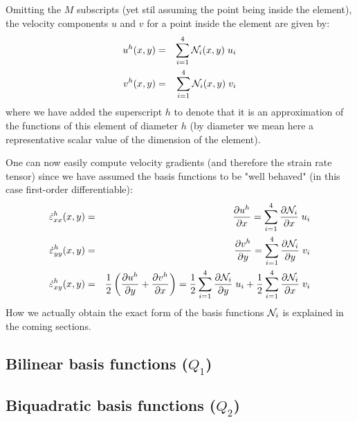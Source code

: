 Omitting the $M$ subscripts (yet stil assuming the point being inside the element), the velocity 
components $u$ and $v$ for a point inside the element
 are given by:
\begin{eqnarray}
u^h(x,y) &=& \sum_{i=1}^4 {\mathcal{N}}_i(x,y)\;  u_i \\
v^h(x,y) &=& \sum_{i=1}^4 {\mathcal{N}}_i(x,y)\;  v_i \label{bf01}
\end{eqnarray}
where we have added the superscript $h$ to denote that it is an approximation of the functions 
of this element of diameter $h$ (by diameter we mean here a representative scalar value of the dimension
of the element). 

One can now easily compute velocity gradients (and therefore the 
strain rate tensor) since we have assumed the basis functions to be "well behaved" 
(in this case first-order differentiable):
\begin{eqnarray}
\dot{\varepsilon}^h_{xx}(x,y) 
&=& \frac{\partial u^h}{\partial x} = \sum_{i=1}^4 \frac{\partial {\mathcal{N}}_i}{\partial x}\;  u_i \\
\dot{\varepsilon}^h_{yy}(x,y) 
&=& \frac{\partial v^h}{\partial y} = \sum_{i=1}^4 \frac{\partial {\mathcal{N}}_i}{\partial y}\;  v_i \\
\dot{\varepsilon}^h_{xy}(x,y) 
&=& \frac{1}{2}\left(\frac{\partial u^h}{\partial y} + \frac{\partial v^h}{\partial x} \right) 
= \frac{1}{2}\sum_{i=1}^4 \frac{\partial {\mathcal{N}}_i}{\partial y}\;  u_i
+ \frac{1}{2}\sum_{i=1}^4 \frac{\partial {\mathcal{N}}_i}{\partial x}\;  v_i
\end{eqnarray}
How we actually obtain the exact form of the basis functions ${\mathcal{N}}_i$ is explained in the coming sections.

\subsection{Bilinear basis functions ($Q_1$)} \label{ss:q12d}



\subsection{Biquadratic basis functions ($Q_2$)}\label{ss:q22d}



